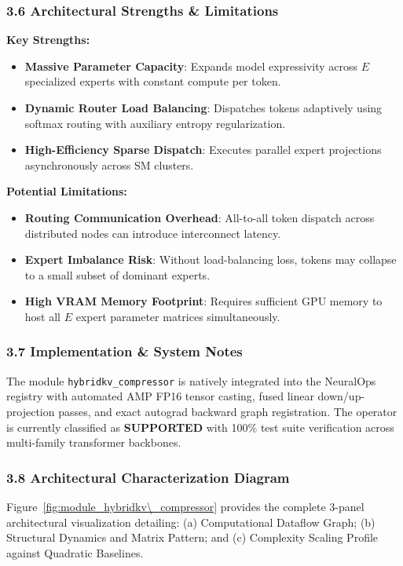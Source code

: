 \subsubsection*{3.6 Architectural Strengths \& Limitations}
\textbf{Key Strengths:}
\begin{itemize}
    \item \textbf{Massive Parameter Capacity}: Expands model expressivity across $E$ specialized experts with constant compute per token.
    \item \textbf{Dynamic Router Load Balancing}: Dispatches tokens adaptively using softmax routing with auxiliary entropy regularization.
    \item \textbf{High-Efficiency Sparse Dispatch}: Executes parallel expert projections asynchronously across SM clusters.
\end{itemize}

\textbf{Potential Limitations:}
\begin{itemize}
    \item \textbf{Routing Communication Overhead}: All-to-all token dispatch across distributed nodes can introduce interconnect latency.
    \item \textbf{Expert Imbalance Risk}: Without load-balancing loss, tokens may collapse to a small subset of dominant experts.
    \item \textbf{High VRAM Memory Footprint}: Requires sufficient GPU memory to host all $E$ expert parameter matrices simultaneously.
\end{itemize}

\subsubsection*{3.7 Implementation \& System Notes}
The module \texttt{hybridkv\_compressor} is natively integrated into the NeuralOps registry with automated AMP FP16 tensor casting, fused linear down/up-projection passes, and exact autograd backward graph registration. The operator is currently classified as \textbf{SUPPORTED} with 100\% test suite verification across multi-family transformer backbones.

\subsubsection*{3.8 Architectural Characterization Diagram}
Figure~\ref{fig:module_hybridkv\_compressor} provides the complete 3-panel architectural visualization detailing: (a) Computational Dataflow Graph; (b) Structural Dynamics and Matrix Pattern; and (c) Complexity Scaling Profile against Quadratic Baselines.

